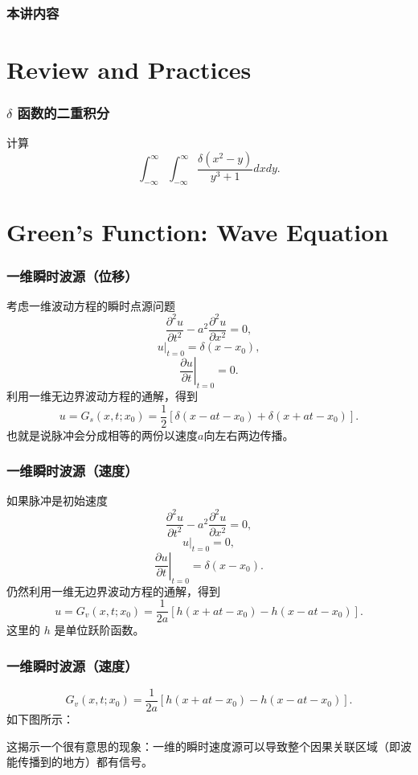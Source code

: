 \documentclass[CJK]{beamer}
\date{}
\begin{document}
  \bch
{}

\begin{frame}
  \frametitle{本讲内容}
  
\tableofcontents

\end{frame}

\section{Review and Practices}


\begin{frame}
  \frametitle{$\delta$ 函数的二重积分}
  计算
  $$\int_{-\infty}^\infty\int_{-\infty}^\infty \frac{\delta(x^2-y)}{y^3+1} dxdy.$$
\end{frame}

\section{Green's Function: Wave Equation}

\begin{frame}
  \frametitle{一维瞬时波源（位移）}
  考虑一维波动方程的瞬时点源问题
  $$\frac{\partial^2u}{\partial t^2}-a^2\frac{\partial^2u }{\partial x^2} = 0, $$
  $$\left. u\right\vert_{t=0} = \delta(x-x_0),$$
  $$\left. \frac{\partial u}{\partial t}\right\vert_{t=0} = 0.$$  
  利用一维无边界波动方程的通解，得到
  $$ u = G_s(x,t;x_0) = \frac{1}{2}\left[\delta(x-at-x_0) + \delta(x+at-x_0)\right].$$
  也就是说脉冲会分成相等的两份以速度$a$向左右两边传播。
\end{frame}

\begin{frame}
  \frametitle{一维瞬时波源（速度）}
  如果脉冲是初始速度
  $$\frac{\partial^2u}{\partial t^2}-a^2\frac{\partial^2u }{\partial x^2} = 0, $$
  $$\left. u\right\vert_{t=0} = 0,$$
  $$\left. \frac{\partial u}{\partial t}\right\vert_{t=0} = \delta(x-x_0).$$  
  仍然利用一维无边界波动方程的通解，得到
  $$ u = G_v(x,t;x_0) = \frac{1}{2a}\left[h(x+at-x_0) - h(x-at-x_0)\right].$$
  这里的 $h$ 是单位跃阶函数。


\end{frame}

\begin{frame}
  \frametitle{一维瞬时波源（速度）}
  
  $$G_v(x,t;x_0) = \frac{1}{2a}\left[h(x+at-x_0) - h(x-at-x_0)\right].$$
  如下图所示：
  

  这揭示一个很有意思的现象：一维的瞬时速度源可以导致整个因果关联区域（即波能传播到的地方）都有信号。
\end{frame}
\end{document}
